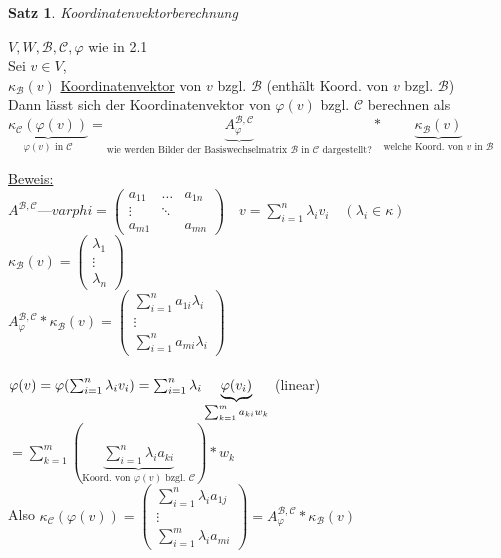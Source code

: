 \documentclass[a4paper,11pt]{article}
\newtheorem{satz}[definition]{Satz}
\begin{document}
\begin{satz}
	Koordinatenvektorberechnung
\end{satz}
$V,W,\mathcal{B},\mathcal{C},\varphi$ wie in 2.1 \\
Sei $v\in V$, \\
$\kappa_\mathcal{B}(v)$ \underline{Koordinatenvektor} von $v$ bzgl. $\mathcal{B}$ (enthält Koord. von $v$ bzgl. $\mathcal{B}$) \\
Dann lässt sich der Koordinatenvektor von $\varphi(v)$ bzgl. $\mathcal{C}$ berechnen als \\
$\underbrace{\kappa_\mathcal{C}(\varphi(v))}_{\varphi(v)\text{ in }\mathcal{C}}=\underbrace{A^{\mathcal{B},\mathcal{C}}_\varphi}_{\text{wie werden Bilder der Basiswechselmatrix $\mathcal{B}$ in $\mathcal{C}$ dargestellt?}}*\underbrace{\kappa_\mathcal{B}(v)}_{\text{welche Koord. von $v$ in $\mathcal{B}$}}$

\newpage

\underline{Beweis:} \\
$A^{\mathcal{B},\mathcal{C}}—varphi=\begin{pmatrix}a_{11} & \hdots & a_{1n} \\ \vdots & \ddots \\ a_{m1} & & a_{mn}\end{pmatrix}\quad v=\sum^n_{i=1}\lambda_iv_i\quad(\lambda_i\in\kappa)$ \\
$\kappa_\mathcal{B}(v)=\begin{pmatrix}\lambda_1 \\ \vdots \\ \lambda_n\end{pmatrix}$ \\
$A^{\mathcal{B},\mathcal{C}}_\varphi*\kappa_\mathcal{B}(v)=\begin{pmatrix}\sum^n_{i=1}a_{1i}\lambda_i \\ \vdots \\ \sum^n_{i=1}a_{mi}\lambda_i\end{pmatrix}$ \\ \\
$\varphi(v)=\varphi(\sum^n_{i=1}\lambda_iv_i) \\
=\sum^n_{i=1}\lambda_i\underbrace{\varphi(v_i)}_{\sum^m_{k=1}a_{ki}w_k}$ (linear) \\
$=\sum^m_{k=1}(\underbrace{\sum^n_{i=1}\lambda_ia_{ki}}_{\text{Koord. von $\varphi(v)$ bzgl. $\mathcal{C}$}})*w_k$ \\
Also $\kappa_\mathcal{C}(\varphi(v))=\begin{pmatrix}\sum^n_{i=1}\lambda_ia_{1j} \\ \vdots \\ \sum^m_{i=1}\lambda_ia_{mi}\end{pmatrix}=A^{\mathcal{B},\mathcal{C}}_\varphi*\kappa_\mathcal{B}(v)$
\end{document}

